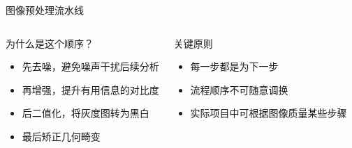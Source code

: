 \begin{frame}{图像预处理流水线}
    \begin{columns}[t]
        \begin{block}{为什么是这个顺序？}
            \begin{itemize}
                \small
                \item 先去噪，避免噪声干扰后续分析
                \item 再增强，提升有用信息的对比度
                \item 后二值化，将灰度图转为黑白
                \item 最后矫正几何畸变
            \end{itemize}
        \end{block}

        \begin{block}{关键原则}
            \begin{itemize}
                \small
                \item 每一步都是为下一步
                \item 流程顺序不可随意调换
                \item 实际项目中可根据图像质量某些步骤
            \end{itemize}
        \end{block}
    \end{columns}
\end{frame}

